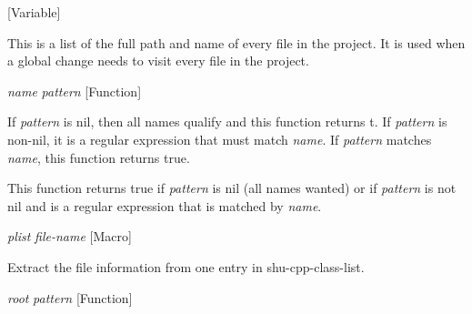 \vspace{1em}
\noindent
{}
\usebox{\funcname}
 \hfill [Variable]

\begin{doc-string}
This is a list of the full path and name of every file in the project.
It is used when a global change needs to visit every file in the project.
\end{doc-string}

\vspace{1em}
\noindent
{}
\usebox{\funcname}\emph{name} \emph{pattern}
 \hfill [Function]

\begin{doc-string}
If \emph{pattern} is nil, then all names qualify and this function returns t.
If \emph{pattern} is non-nil, it is a regular expression that must match \emph{name}.  If
\emph{pattern} matches \emph{name}, this function returns true.

This function returns true if \emph{pattern} is nil (all names wanted) or if
\emph{pattern} is not nil and is a regular expression that is matched by \emph{name}.
\end{doc-string}

\vspace{1em}
\noindent
{}
\usebox{\funcname}\emph{plist} \emph{file-name}
 \hfill [Macro]
\hspace*{\wd\funcname}

\begin{doc-string}
Extract the file information from one entry in shu-cpp-class-list.
\end{doc-string}

\vspace{1em}
\noindent
{}
\usebox{\funcname}\emph{root} \emph{pattern}
 \hfill [Function]
\hspace*{\wd\funcname}

